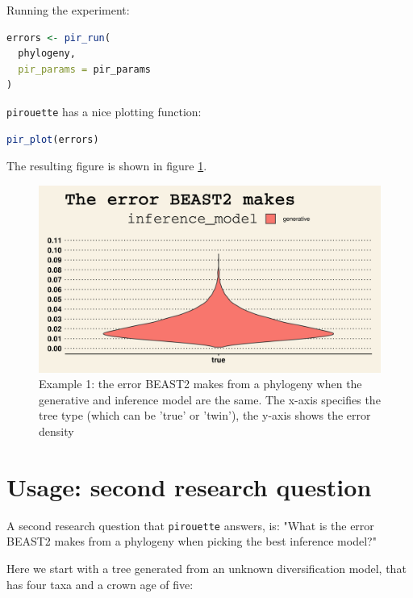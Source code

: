 \documentclass{article}
\begin{document}
Running the experiment:

\begin{lstlisting}[language=R, floatplacement=H, frame=single]
errors <- pir_run(
  phylogeny,
  pir_params = pir_params
)
\end{lstlisting}

\verb;pirouette; has a nice plotting function:

\begin{lstlisting}[language=R, floatplacement=H, frame=single]
pir_plot(errors)
\end{lstlisting}

The resulting figure is shown in figure \ref{fig:example_1}.

\begin{figure}[h]
  \includegraphics[width=\textwidth]{figure_example_1.png}
  \caption{
    Example 1: the error BEAST2 makes from a phylogeny 
    when the generative and inference model are the same.
    The x-axis specifies the tree type (which can be 'true' or 'twin'),
    the y-axis shows the error density
  }
  \label{fig:example_1}
\end{figure}

\section{Usage: second research question}

A second research question that \verb;pirouette; answers, is:
"What is the error BEAST2 makes from a phylogeny when
picking the best inference model?"

Here we start with a tree generated from an unknown 
diversification model, that has four taxa and a crown age of five:
\end{document}
